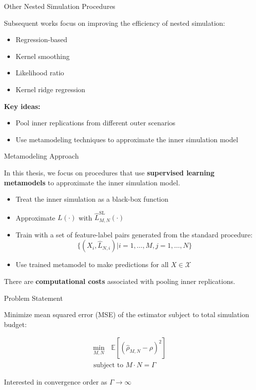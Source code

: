 \documentclass[9pt,handout]{beamer}
\begin{document}
\begin{frame}{Other Nested Simulation Procedures}

Subsequent works focus on improving the efficiency of nested simulation:
\begin{itemize}
    \item Regression-based~\citep{broadie2015risk}
    \item Kernel smoothing~\citep{hong2017kernel}
    \item Likelihood ratio~\citep{feng2020optimal}
    \item Kernel ridge regression~\citep{zhang2022sample}
\end{itemize}

\vspace{10pt}

\textbf{Key ideas:} 
\begin{itemize}
    \item Pool inner replications from different outer scenarios 
    \item Use metamodeling techniques to approximate the inner simulation model
\end{itemize}

\end{frame}

\begin{frame}{Metamodeling Approach}

In this thesis, we focus on procedures that use \textbf{supervised learning metamodels} to approximate the inner simulation model.   

\begin{itemize}
    \item Treat the inner simulation as a black-box function
    \item Approximate $L(\cdot)$ with $\hat{L}^{\text{SL}}_{M, N}(\cdot)$
    \item Train with a set of feature-label pairs generated from the standard procedure:
    $$\{(X_i, \hat{L}_{N, i}) \vert i=1, \ldots, M, j=1, \ldots, N\}$$
    \item Use trained metamodel to make predictions for all $X \in \mathcal{X}$
\end{itemize}

There are \textbf{computational costs} associated with pooling inner replications.

\end{frame}

\begin{frame}{Problem Statement}

Minimize mean squared error (MSE) of the estimator subject to total simulation budget:

\begin{align*}
\min_{M, N} ~~~ \mathbb{E} \left[ \left( \hat{\rho}_{M, N} - \rho \right)^2 \right] \\
\text{ subject to } M \cdot N = \Gamma
\end{align*}

Interested in convergence order as $\Gamma \to \infty$

\end{frame}
\end{document}
